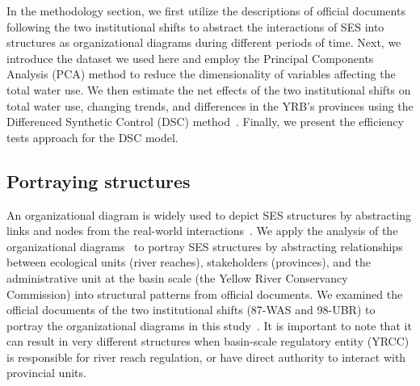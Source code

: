 
In the methodology section, we first utilize the descriptions of official documents following the two institutional shifts to abstract the interactions of SES into structures as organizational diagrams during different periods of time.
Next, we introduce the dataset we used here and employ the Principal Components Analysis (PCA) method to reduce the dimensionality of variables affecting the total water use.
We then estimate the net effects of the two institutional shifts on total water use, changing trends, and differences in the YRB's provinces using the Differenced Synthetic Control (DSC) method~\cite{arkhangelsky2021}.
Finally, we present the efficiency tests approach for the DSC model.

\subsection{Portraying structures}\label{sec:structures}

An organizational diagram is widely used to depict SES structures by abstracting links and nodes from the real-world interactions~\cite{wang2022g,bodin2017a,kluger2020,guerrero2015}.
We apply the analysis of the organizational diagrams~\cite{bodin2017b} to portray SES structures by abstracting relationships between ecological units (river reaches), stakeholders (provinces), and the administrative unit at the basin scale (the Yellow River Conservancy Commission) into structural patterns from official documents.
We examined the official documents of the two institutional shifts (87-WAS and 98-UBR) to portray the organizational diagrams in this study~\cite{bodin2017a,kluger2020,guerrero2015}.
It is important to note that it can result in very different structures when basin-scale regulatory entity (YRCC) is responsible for river reach regulation, or have direct authority to interact with provincial units.

